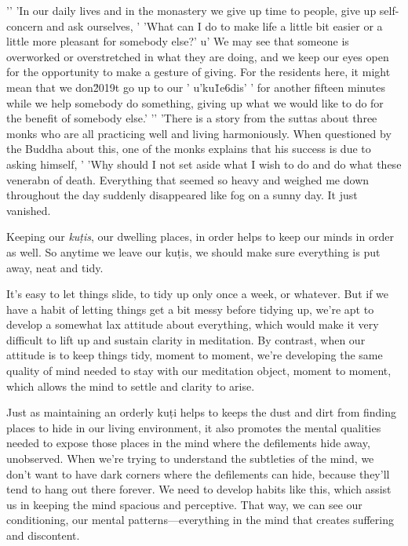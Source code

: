 '\n'
'In our daily lives and in the monastery we give up time to people, give up self-concern and ask ourselves, '
'What can I do to make life a little bit easier or a little more pleasant for somebody else?'
u' We may see that someone is overworked or overstretched in what they are doing, and we keep our eyes open for the opportunity to make a gesture of giving. For the residents here, it might mean that we don\u2019t go up to our '
u'ku\u1e6dis'
' for another fifteen minutes while we help somebody do something, giving up what we would like to do for the benefit of somebody else.'
'\n'
'There is a story from the suttas about three monks who are all practicing well and living harmoniously. When questioned by the Buddha about this, one of the monks explains that his success is due to asking himself, '
'Why should I not set aside what I wish to do and do what these venerabn of death. Everything that seemed so heavy 
and weighed me down throughout the day suddenly disappeared like fog on 
a sunny day. It just vanished.


Keeping our \emph{kuṭis}, our dwelling places, in order helps to keep 
our minds in order as well. So anytime we leave our kuṭis, we should 
make sure everything is put away, neat and tidy.

It's easy to let things slide, to tidy up only once a week, or 
whatever. But if we have a habit of letting things get a bit messy 
before tidying up, we're apt to develop a somewhat lax attitude about 
everything, which would make it very difficult to lift up and sustain 
clarity in meditation. By contrast, when our attitude is to keep things 
tidy, moment to moment, we're developing the same quality of mind 
needed to stay with our meditation object, moment to moment, which 
allows the mind to settle and clarity to arise.

Just as maintaining an orderly kuṭi helps to keeps the dust and dirt 
from finding places to hide in our living environment, it also promotes 
the mental qualities needed to expose those places in the mind where 
the defilements hide away, unobserved. When we're trying to understand 
the subtleties of the mind, we don't want to have dark corners where 
the defilements can hide, because they'll tend to hang out there 
forever. We need to develop habits like this, which assist us in 
keeping the mind spacious and perceptive. That way, we can see our 
conditioning, our mental patterns---everything in the mind that creates 
suffering and discontent.

